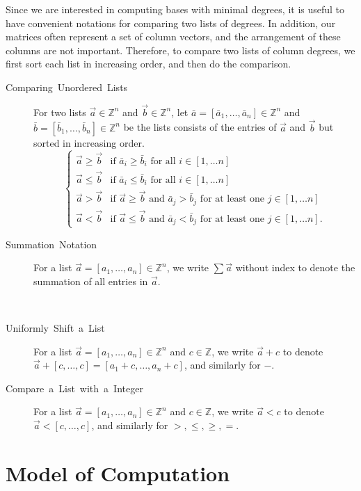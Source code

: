 Since we are interested in computing bases with minimal degrees, it
is useful to have convenient notations for comparing two lists of
degrees.   In addition, our matrices often represent a set of column
vectors, and the arrangement of these columns are not important. Therefore,
to compare two lists of column degrees, we first sort each list in
increasing order, and then do the comparison.
\begin{description}
\item [{Comparing~Unordered~Lists}] For two lists $\vec{a}\in\mathbb{Z}^{n}$
and $\vec{b}\in\mathbb{Z}^{n}$, let $\bar{a}=\left[\bar{a}_{1},\dots,\bar{a}_{n}\right]\in\mathbb{Z}^{n}$
and $\bar{b}=\left[\bar{b}_{1},\dots,\bar{b}_{n}\right]\in\mathbb{Z}^{n}$
be the lists consists of the entries of $\vec{a}$ and $\vec{b}$
but sorted in increasing order. 
\[
\begin{cases}
\vec{a}\ge\vec{b} & \mbox{if }\bar{a}_{i}\ge\bar{b}_{i}\mbox{ for all }i\in\left[1,\dots n\right]\\
\vec{a}\le\vec{b} & \mbox{if }\bar{a}_{i}\le\bar{b}_{i}\mbox{ for all }i\in\left[1,\dots n\right]\\
\vec{a}>\vec{b} & \mbox{if }\vec{a}\ge\vec{b}\mbox{ and }\bar{a}_{j}>\bar{b}_{j}\mbox{ for at least one }j\in\left[1,\dots n\right]\\
\vec{a}<\vec{b} & \mbox{if }\vec{a}\le\vec{b}\mbox{ and }\bar{a}_{j}<\bar{b}_{j}\mbox{ for at least one }j\in\left[1,\dots n\right].
\end{cases}
\]

\item [{Summation~Notation}] For a list $\vec{a}=\left[a_{1},\dots,a_{n}\right]\in\mathbb{Z}^{n}$,
we write $\sum\vec{a}$ without index to denote the summation of all
entries in $\vec{a}$. 
\item [{}]~
\item [{Uniformly~Shift~a~List}] For a list $\vec{a}=\left[a_{1},\dots,a_{n}\right]\in\mathbb{Z}^{n}$
and $c\in\mathbb{Z}$, we write $\vec{a}+c$ to denote $\vec{a}+\left[c,\dots,c\right]=\left[a_{1}+c,\dots,a_{n}+c\right]$,
and similarly for $-$.
\item [{Compare~a~List~with~a~Integer}] For a list $\vec{a}=\left[a_{1},\dots,a_{n}\right]\in\mathbb{Z}^{n}$
and $c\in\mathbb{Z}$, we write $\vec{a}<c$ to denote $\vec{a}<\left[c,\dots,c\right]$,
and similarly for $>,\le,\ge,=$.
\end{description}

\section{Model of Computation}

